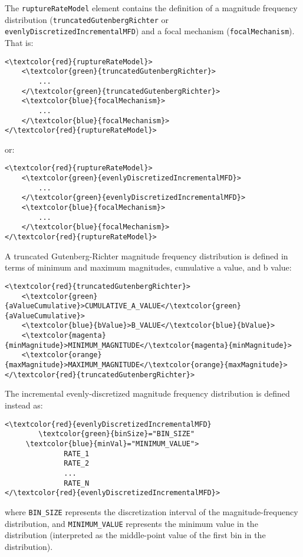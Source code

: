 The \Verb+ruptureRateModel+ element contains the definition of a magnitude frequency distribution (\Verb+truncatedGutenbergRichter+ or \Verb+evenlyDiscretizedIncrementalMFD+) and a focal mechanism (\Verb+focalMechanism+). That is:
\begin{Verbatim}[frame=single, commandchars=\\\{\},fontsize=\normalsize, samepage=true]
<\textcolor{red}{ruptureRateModel}>
	<\textcolor{green}{truncatedGutenbergRichter}>
		...
	</\textcolor{green}{truncatedGutenbergRichter}>
	<\textcolor{blue}{focalMechanism}>
		...
	</\textcolor{blue}{focalMechanism}>
</\textcolor{red}{ruptureRateModel}>
\end{Verbatim}
or:
\begin{Verbatim}[frame=single, commandchars=\\\{\},fontsize=\normalsize, samepage=true]
<\textcolor{red}{ruptureRateModel}>
	<\textcolor{green}{evenlyDiscretizedIncrementalMFD}>
		...
	</\textcolor{green}{evenlyDiscretizedIncrementalMFD}>
	<\textcolor{blue}{focalMechanism}>
		...
	</\textcolor{blue}{focalMechanism}>
</\textcolor{red}{ruptureRateModel}>
\end{Verbatim}
A truncated Gutenberg-Richter magnitude frequency distribution is defined in terms of minimum and maximum magnitudes, cumulative a value, and b value:
\begin{Verbatim}[frame=single, commandchars=\\\{\},fontsize=\normalsize, samepage=true]
<\textcolor{red}{truncatedGutenbergRichter}>
	<\textcolor{green}{aValueCumulative}>CUMULATIVE_A_VALUE</\textcolor{green}{aValueCumulative}>
	<\textcolor{blue}{bValue}>B_VALUE</\textcolor{blue}{bValue}>
	<\textcolor{magenta}{minMagnitude}>MINIMUM_MAGNITUDE</\textcolor{magenta}{minMagnitude}>
	<\textcolor{orange}{maxMagnitude}>MAXIMUM_MAGNITUDE</\textcolor{orange}{maxMagnitude}>
</\textcolor{red}{truncatedGutenbergRichter}>
\end{Verbatim}
The incremental evenly-discretized magnitude frequency distribution is defined instead as:
\begin{Verbatim}[frame=single, commandchars=\\\{\},fontsize=\normalsize, samepage=true]
<\textcolor{red}{evenlyDiscretizedIncrementalMFD} 
        \textcolor{green}{binSize}="BIN_SIZE"
 	 \textcolor{blue}{minVal}="MINIMUM_VALUE">
              RATE_1
              RATE_2
              ...
              RATE_N
</\textcolor{red}{evenlyDiscretizedIncrementalMFD}>
\end{Verbatim}
where \Verb+BIN_SIZE+ represents the discretization interval of the magnitude-frequency distribution, and \Verb+MINIMUM_VALUE+ represents the minimum value in the distribution (interpreted as the middle-point value of the first bin in the distribution).\\
